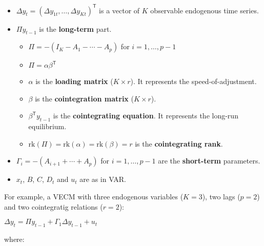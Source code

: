 \documentclass[10pt, a4paper, landscape]{article}
\newcommand{\tr}{\mathsf{T}}
\newcommand{\rk}{\mathrm{rk}}
\begin{document}
\begin{multicols}{2}
		\begin{itemize}[leftmargin=*]
			\item $\Delta y_{t} = (\Delta y_{1t}, \ldots, \Delta y_{Kt})^{\tr}$ is a vector of $K$ observable endogenous time series.
			\item $\Pi y_{t - 1}$ is the \textbf{long-term} part.
			\begin{itemize}[leftmargin=*, label={$\diamond$}]
				\item $\Pi = - (I_{K} - A_{1} - \cdots - A_{p})$ for $i = 1, \ldots, p - 1$
				\item $\Pi = \alpha \beta^{\tr}$
				\item $\alpha$ is the \textbf{loading matrix} ($K \times r$). It represents the speed-of-adjustment.
				\item $\beta$ is the \textbf{cointegration matrix} ($K \times r$).
				\item $\beta^{\tr} y_{t - 1}$ is the \textbf{cointegrating equation}. It represents the long-run equilibrium.
				\item $\rk(\Pi) = \rk(\alpha) = \rk(\beta) = r$ is the \textbf{cointegrating rank}.
			\end{itemize}
			\item $\Gamma_{i} = - (A_{i + 1} + \cdots + A_{p})$ for $i = 1, \ldots, p - 1$ are the \textbf{short-term} parameters.
			\item $x_{t}$, $B$, $C$, $D_{t}$ and $u_{t}$ are as in VAR.
		\end{itemize}
		
		For example, a VECM with three endogenous variables ($K = 3$), two lags ($p = 2$) and two cointegratig relations ($r = 2$):
		
		\begin{center}
			$\Delta y_{t} = \Pi y_{t - 1} + \Gamma_{1} \Delta y_{t - 1} + u_{t}$
		\end{center}
		
		\quad where:
		

\end{multicols}
\end{document}
